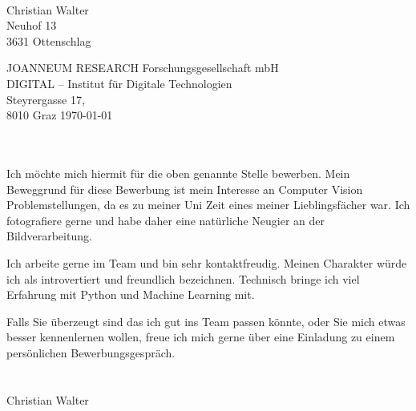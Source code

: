 \documentclass[11pt, a4paper]{article}
\begin{document}
\vspace*{1cm}
\begin{center}
  \\
\end{center}

\vspace{1cm}
Christian Walter\\
Neuhof 13\\
3631 Ottenschlag\\
\vspace{1cm}

JOANNEUM RESEARCH Forschungsgesellschaft mbH\\
DIGITAL – Institut für Digitale Technologien\\
Steyrergasse 17,\\
8010 Graz
\hfill
\today\\
\vspace{1cm}

\\\\
Ich möchte mich hiermit für die oben genannte Stelle bewerben.
Mein Beweggrund für diese Bewerbung ist mein Interesse an Computer Vision Problemstellungen, da es zu meiner Uni Zeit eines meiner Lieblingsfächer war.
Ich fotografiere gerne und habe daher eine natürliche Neugier an der Bildverarbeitung.

Ich arbeite gerne im Team und bin sehr kontaktfreudig.
Meinen Charakter würde ich als introvertiert und freundlich bezeichnen.
Technisch bringe ich viel Erfahrung mit Python und Machine Learning mit.

Falls Sie überzeugt sind das ich gut ins Team passen könnte, oder Sie mich etwas besser kennenlernen wollen, freue ich mich gerne über eine Einladung zu einem persönlichen Bewerbungsgespräch.\\

\\\\ Christian Walter
\end{document}
